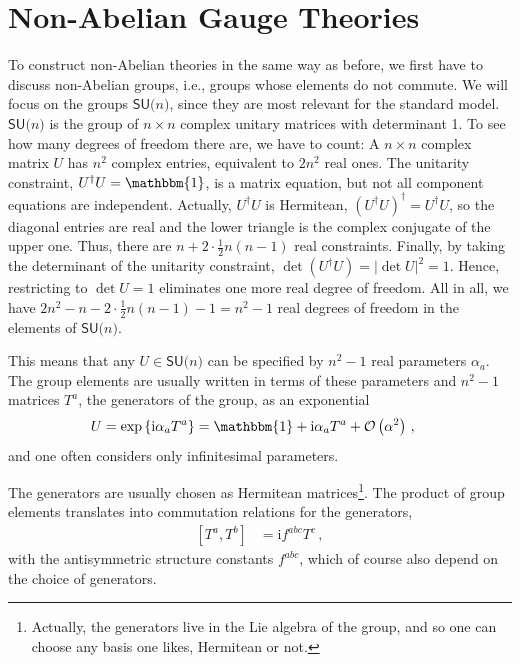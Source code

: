 \documentclass[12pt]{report}
\newcommand{\sun}{\ensuremath{\mathsf{SU(}n\mathsf{)}}}
\renewcommand{\i}{\ensuremath{\text{i}}}
\newcommand{\2}{\ensuremath{\sqrt{2}\,}}
\begin{document}
{        
    \section{Non-Abelian Gauge Theories}
      To construct non-Abelian theories in the same way as before, we first have to discuss
      non-Abelian groups, i.e., groups whose elements do not commute. We will focus on the groups
      $\sun$, since they are  
      most relevant for the standard model. $\sun$ is the group of $n\times n$ complex unitary
      matrices with determinant 1. To see how many degrees of freedom there are, we have to count: A
      $n\times n$ complex matrix $U$ has $n^2$ complex entries, equivalent to  $2n^2$ real
      ones. The unitarity constraint, $U^\dagger U=\mathbbm{1}$, is a matrix equation, but not all
      component equations are independent. Actually, $U^\dagger U$  is Hermitean, $\left(U^\dagger
        U\right)^\dagger=U^\dagger U$, so the diagonal entries are real and the 
      lower triangle is the complex conjugate of the upper one. Thus, there are $n +2\cdot\frac{1}{2}
      n (n-1)$ real constraints.  Finally, by taking the determinant of the unitarity constraint,
      $\det \left(U^\dagger U\right)=\left|\det U\right|^2 =1$. Hence, restricting to $\det U=1$ eliminates
      one more real degree of freedom. All in all, we have $2 n^2 - n -2\cdot\frac{1}{2}n (n-1)
      -1=n^2-1$ real degrees of freedom in the elements of $\sun$.
        
      This means that any $U\in\sun$ can be specified by $n^2-1$ real parameters
      $\alpha_a$. The group elements are usually written in terms of these parameters and $n^2-1$
      matrices $T^a$, the generators of the group, as an exponential
      \begin{align}
        U & = \exp\left\{\i \alpha_a T^a\right\}= \mathbbm{1} + \i \alpha_a T^a
        +\mathcal{O}\left(\alpha^2\right) \,, 
      \end{align}
      and one often considers only infinitesimal parameters.
      
      The generators are usually chosen as Hermitean matrices\footnote{Actually, the generators
        live in the Lie algebra of the group, and so one can choose any basis one likes, Hermitean
        or not.}.  The product of group elements translates into commutation relations for the
      generators, 
      \begin{align}
        \left[T^a,T^b\right]&=\i f^{abc}  T^c\,,
      \end{align}
      with the antisymmetric structure constants $f^{abc}$, which of
      course also depend on the choice of generators.

}
\end{document}
